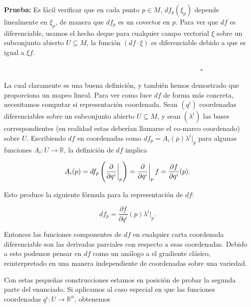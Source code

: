 \documentclass[a4paper,10pt]{article}
\numberwithin{equation}{section}
\newcommand{\zerodel}{.\kern-\nulldelimiterspace}
\newcommand{\prueba}{\textbf{Prueba: }}
\begin{document}
\vspace{.3cm}

\prueba Es fácil verificar que en cada punto $p \in M$, $df_p(\xi_p)$ depende linealmente 
en $\xi_p$, de manera que $df_p$ es un covector en $p$. Para ver que $df$ es diferenciable, 
usamos el hecho deque para cualquier campo vectorial $\xi$ sobre un subconjunto 
abierto $U \subseteq M$, la función $(df \cdot \xi)$ es diferenciable debido a que 
es igual a $\xi f$.

$\hspace{12cm} \square$

La cual claramente es una buena definición, y también hemos demostrado que proporciona 
un mapeo lineal. Para ver como luce $df$ de forma más concreta, necesitamos computar si representación 
coordenada. Sean $(q^i)$ coordenadas diferenciables sobre un subconjunto abierto 
$U \subseteq M$, y sean $(\lambda^i)$ las bases correspondientes (en realidad 
estas deberían llamarse el co-marco coordenado) sobre $U$. Escribiendo $df$ en 
coordenadas como $df_p = A_i(p)\lambda^i|_p$ para algunas funciones $A_i:U\rightarrow \mathbb{R}$, 
la definición de $df$ implica 

\begin{equation}
 A_i(p) = df_p\left( \left\zerodel \frac{\partial}{\partial q^i}\right|_p \right) = 
  \left\zerodel \frac{\partial}{\partial q^i}\right|_p f = \frac{\partial f}{\partial q^i}(p).
\end{equation}

Esto produce la siguiente fórmula para la representación de $df$:

\begin{equation}
 df_p = \frac{\partial f}{\partial q^i}(p) \lambda^i|_p.
 \label{eq:diferencial1}
\end{equation}

Entonces las funciones componentes de $df$ en cualquier carta coordenada diferenciable 
son las derivadas parciales con respecto a esas coordenadas. Debido a esto podemos 
pensar en $df$ como un análogo a el gradiente clásico, reinterpretado en una manera 
independiente de coordenadas sobre una variedad.

\vspace{.3cm}

Con estas pequeñas construcciones estamos en posición de probar la segunda parte 
del enunciado. Si aplicamos  al caso especial en que las 
funciones coordenadas $q^i: U \rightarrow \mathbb{R}^n$, obtenemos 
\end{document}
